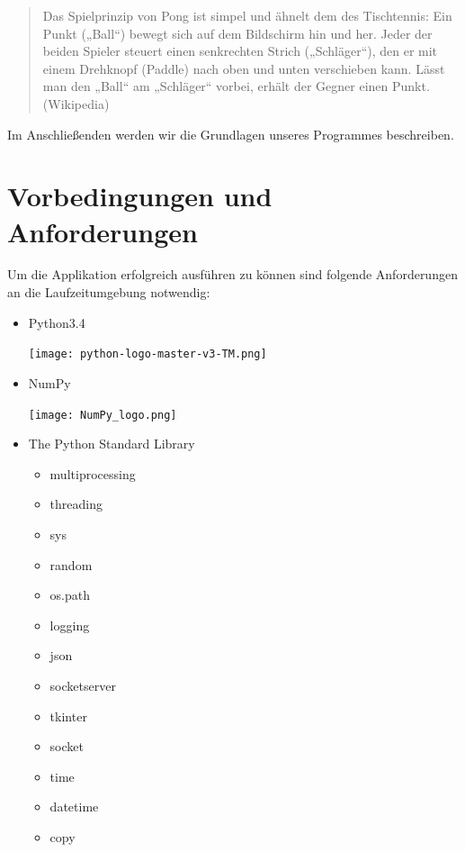 \documentclass[12pt,twoside]{article}
\theoremstyle{plain}
\theoremstyle{definition}
\theoremstyle{remark}
\begin{document}
\begin{quote}
Das Spielprinzip von Pong ist simpel und ähnelt dem des Tischtennis: Ein Punkt („Ball“) bewegt sich auf dem Bildschirm hin und her. Jeder der beiden Spieler steuert einen senkrechten Strich („Schläger“), den er mit einem Drehknopf (Paddle) nach oben und unten verschieben kann. Lässt man den „Ball“ am „Schläger“ vorbei, erhält der Gegner einen Punkt. 
(Wikipedia)
\end{quote}

Im Anschließenden werden wir die Grundlagen unseres Programmes beschreiben.



\setcounter{tocdepth}{2} 					%
\tableofcontents
{}




\section{Vorbedingungen und Anforderungen}

Um die Applikation erfolgreich ausführen zu können sind folgende Anforderungen an die Laufzeitumgebung notwendig:


\begin{itemize}
\item Python3.4
\begin{centering}
\texttt{[image: python-logo-master-v3-TM.png]}
\end{centering}
\item NumPy
\begin{centering}
\texttt{[image: NumPy\_logo.png]}
\end{centering}
\item The Python Standard Library 
\begin{itemize}
 \item multiprocessing
 \item threading
 \item sys
 \item random
 \item os.path
 \item logging
 \item json
 \item socketserver
 \item tkinter
 \item socket
 \item time
 \item datetime
 \item copy
 
 
\end{itemize} 

\end{itemize} 
 
\end{document}
